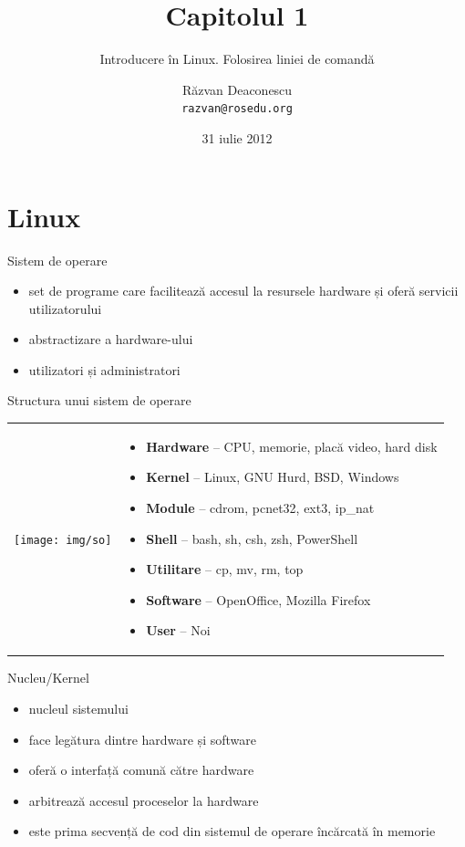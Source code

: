 \documentclass{curs}
\title[Capitolul 1]{Capitolul 1}
\subtitle{Introducere în Linux. Folosirea liniei de comandă}
\author{Răzvan Deaconescu \\
   \texttt{razvan@rosedu.org}}
\date{31 iulie 2012}
\begin{document}
\frame{\titlepage}


\section{Linux}

\begin{frame}{Sistem de operare}
  \begin{itemize}
    \item set de programe care facilitează accesul la resursele hardware și
      oferă servicii utilizatorului
    \item abstractizare a hardware-ului
    \item utilizatori și administratori
  \end{itemize}
\end{frame}

\begin{frame}{Structura unui sistem de operare}
  \begin{tabular}{m{}m{}}
    \texttt{[image: img/so]}
    &
    \begin{itemize}
      \item \textbf{Hardware} -- CPU, memorie, placă video, hard disk
      \item \textbf{Kernel} -- Linux, GNU Hurd, BSD, Windows
      \item \textbf{Module} -- cdrom, pcnet32, ext3, ip\_nat
      \item \textbf{Shell} -- bash, sh, csh, zsh, PowerShell
      \item \textbf{Utilitare} -- cp, mv, rm, top
      \item \textbf{Software} -- OpenOffice, Mozilla Firefox
      \item \textbf{User} -- Noi
    \end{itemize}
  \end{tabular}
\end{frame}

\begin{frame}{Nucleu/Kernel}
  \begin{itemize}
    \item<1-> nucleul sistemului
    \item<2-> face legătura dintre hardware și software
    \item<3-> oferă o interfață comună către hardware
    \item<4-> arbitrează accesul proceselor la hardware
    \item<5-> este prima secvență de cod din sistemul de operare încărcată în
      memorie
  \end{itemize}
\end{frame}
\end{document}
